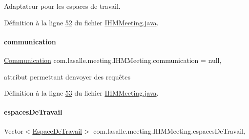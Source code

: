 Adaptateur pour les espaces de travail. 



Définition à la ligne \hyperlink{_i_h_m_meeting_8java_source_l00052}{52} du fichier \hyperlink{_i_h_m_meeting_8java_source}{I\+H\+M\+Meeting.\+java}.

\mbox{\label{classcom_1_1lasalle_1_1meeting_1_1_i_h_m_meeting_a12567e2164a68e0cbe74487935c1263e}} 
\paragraph{\texorpdfstring{communication}{communication}}
{\footnotesize\ttfamily \hyperlink{classcom_1_1lasalle_1_1meeting_1_1_communication}{Communication} com.\+lasalle.\+meeting.\+I\+H\+M\+Meeting.\+communication = null\hspace{0.3cm}{\ttfamily [static]}, {\ttfamily [private]}}



attribut permettant d\textquotesingle{}envoyer des requêtes 



Définition à la ligne \hyperlink{_i_h_m_meeting_8java_source_l00053}{53} du fichier \hyperlink{_i_h_m_meeting_8java_source}{I\+H\+M\+Meeting.\+java}.

\mbox{\label{classcom_1_1lasalle_1_1meeting_1_1_i_h_m_meeting_acba41978aec60c27f07db774f9b68b68}} 
\paragraph{\texorpdfstring{espaces\+De\+Travail}{espacesDeTravail}}
{\footnotesize\ttfamily Vector$<$\hyperlink{classcom_1_1lasalle_1_1meeting_1_1_espace_de_travail}{Espace\+De\+Travail}$>$ com.\+lasalle.\+meeting.\+I\+H\+M\+Meeting.\+espaces\+De\+Travail\hspace{0.3cm}{\ttfamily [static]}, {\ttfamily [private]}}



